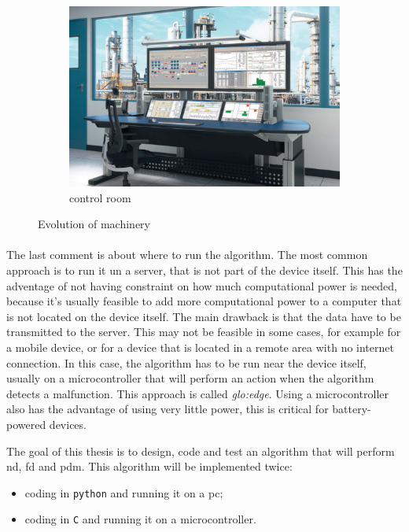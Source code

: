 \begin{figure}[htbp]
\begin{subfigure}{0.3\textwidth}
        \includegraphics[width=\textwidth]{images/control-rooms-workstations.jpg}
        \caption{control room \cite{evosite}}
        \label{fig:controlroom}
    \end{subfigure}
    \caption{Evolution of machinery}
    \label{fig:machineryevolution}
\end{figure}

\paragraph*{}
The last comment is about where to run the algorithm. The most common approach is to run it un a server, that is not part of the device itself. This has the adventage of not having constraint on how much computational power is needed, because it's usually feasible to add more computational power to a computer that is not located on the device itself. The main drawback is that the data have to be transmitted to the server. This may not be feasible in some cases, for example for a mobile device, or for a device that is located in a remote area with no internet connection. In this case, the algorithm has to be run near the device itself, usually on a microcontroller that will perform an action when the algorithm detects a malfunction. This approach is called \emph{\gls{glo:edge}}. Using a microcontroller also has the advantage of using very little power, this is critical for battery-powered devices.

The goal of this thesis is to design, code and test an algorithm that will perform \gls{nd}, \gls{fd} and \gls{pdm}. This algorithm will be implemented twice:
\begin{itemize}
    \item  coding in \texttt{python} and running it on a \gls{pc};
    \item   coding in \texttt{C} and running it on a microcontroller.
\end{itemize}
